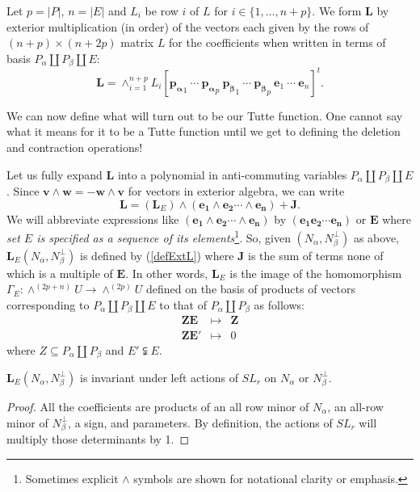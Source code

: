 \documentclass[Unicode]{cedram-alco}
\newcommand{\ext}[1]{\ensuremath{\mathbf{#1}}}
\newcommand{\dunion}{\coprod}
\begin{document}
Let $p = |P|$, $n=|E|$ and $L_i$ be row $i$ of $L$ for $i\in\{1,\ldots,n+p\}$.
We form $\ext{L}$ by exterior multiplication (in order) of the vectors each given by the
rows of $(n+p)\times (n+2p)$ matrix $L$ for the coefficients when written in terms of
basis $P_\alpha \dunion P_\beta \dunion E$:
\begin{equation}\label{defExtL}
  \ext{L} = \wedge_{i=1}^{n+p}L_i
      [\ext{p_\alpha}_1\ \cdots\ \ext{p_\alpha}_{p}\ \ext{p_\beta}_1\ \cdots\ \ext{p_\beta}_{p}\
      \ext{e}_1\ \cdots\ \ext{e}_{n}]^t. 
\end{equation}

We can now define what will turn out to be our Tutte function.  One cannot say what it means for
it to be a Tutte function until we get to defining the deletion and contraction operations!

Let us fully expand $\ext{L}$ into a polynomial in anti-commuting variables
$P_\alpha \dunion P_\beta \dunion E$.  Since $\ext{v}\wedge\ext{w}=-\ext{w}\wedge\ext{v}$ for vectors in
exterior algebra, we can write
\[
\ext{L} = (\ext{L}_E)\wedge (\ext{e_1}\wedge\ext{e_2}\cdots\wedge\ext{e_n}) + \ext{J}.
\]
We will abbreviate expressions like $(\ext{e_1}\wedge\ext{e_2}\cdots\wedge\ext{e_n})$ by
$(\ext{e_1}\ext{e_2}\cdots\ext{e_n})$ or $\ext{E}$ where
\emph{set $E$ is specified as a sequence of its elements}\footnote{
Sometimes explicit $\wedge$ symbols are shown for notational clarity or emphasis.}.
So, given $(N_\alpha,N_\beta^\perp)$ as above, $\ext{L}_E(N_\alpha,N_\beta^\perp)$ is defined by (\ref{defExtL}) where
$\ext{J}$ is the sum of terms none of which is a multiple of $\ext{E}$.
In other words, $\ext{L}_E$ is the image of the homomorphism
$\Gamma_E:\wedge^{(2p+n)}U\rightarrow\wedge^{(2p)}U$ defined on the basis of
products of vectors corresponding to $P_\alpha \dunion P_\beta \dunion E$ to that
of $P_\alpha \dunion P_\beta$ as follows:
\[
   \begin{array}{ccc}
     \ext{Z}\ext{E} & \longmapsto & \ext{Z} \\
     \ext{Z}\ext{E'} & \longmapsto & 0
   \end{array}
\]
where $Z\subseteq P_\alpha \dunion P_\beta$ and $E'\subsetneqq E$.

\begin{prop}
  $\ext{L}_E(N_\alpha,N_\beta^\perp)$ is invariant under left actions of $SL_r$ on $N_\alpha$ or $N_\beta^\perp$.
\end{prop}
\begin{proof}
  All the coefficients are products of an all row minor of $N_\alpha$, an all-row minor of $N_\beta^\perp$, a sign, and
  parameters.
  By definition, the actions of $SL_r$ will multiply those determinants by 1. 
\end{proof}
\end{document}
